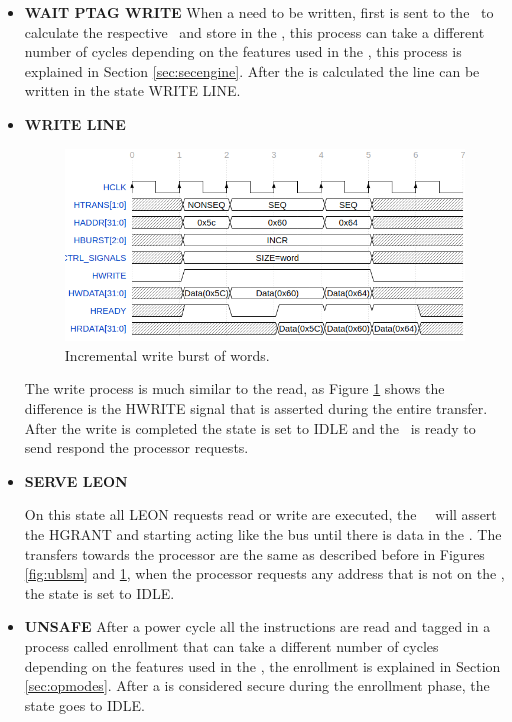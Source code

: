 \begin{itemize}
 \item{\textbf{WAIT PTAG WRITE}}
 When a \sline need to be written, first is sent to the \seceng~to calculate the respective \ptag~and store in the \ptagmem, this process can take a different number of cycles depending on the features used in the \seceng, this process is explained in Section \ref{sec:secengine}. After the \ptag is calculated the line can be written in the state WRITE LINE.
 
 
 \item{\textbf{WRITE LINE}}
   \begin{figure}[H]
    \centering
    \includegraphics[width=\textwidth]{figures/others/ahbwrite.png}
    \caption{Incremental write burst of words.}
    \label{fig:ahbwrite}
  \end{figure}
The write process is much similar to the read, as Figure \ref{fig:ahbwrite} shows the difference is the HWRITE signal that is asserted during the entire transfer. After the write is completed the state is set to IDLE and the \handler~is ready to send respond the processor requests.

 \item{\textbf{SERVE LEON}}

 On this state all LEON requests read or write are executed, the \handler~~will assert the HGRANT and starting acting like the bus until there is data in the \sbuf. The transfers towards the processor are the same as described before in Figures \ref{fig:ublsm} and \ref{fig:ahbwrite}, when the processor requests any address that is not on the \sbuf, the state is set to IDLE.
 
\item{\textbf{UNSAFE}}
After a power cycle all the instructions are read and tagged in a process called enrollment that can take a different number of cycles depending on the features used in the \seceng, the enrollment is explained in Section \ref{sec:opmodes}. After a \sline is considered secure during the enrollment phase, the state goes to IDLE.
 
\end{itemize}

